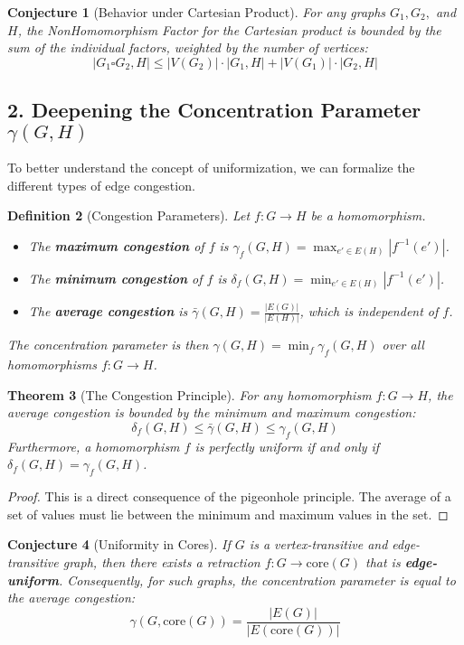 \documentclass[11pt]{article}
\newtheorem{theorem}{Theorem}[section]
\newtheorem{conjecture}[theorem]{Conjecture}
\newtheorem{definition}[theorem]{Definition}
\begin{document}
\begin{conjecture}[Behavior under Cartesian Product]
For any graphs $G_1, G_2,$ and $H$, the NonHomomorphism Factor for the Cartesian product is bounded by the sum of the individual factors, weighted by the number of vertices:
$$|G_1 \square G_2, H| \le |V(G_2)| \cdot |G_1, H| + |V(G_1)| \cdot |G_2, H|$$
\end{conjecture}

\subsection*{2. Deepening the Concentration Parameter $\gamma(G,H)$}
To better understand the concept of uniformization, we can formalize the different types of edge congestion.

\begin{definition}[Congestion Parameters]
Let $f: G \to H$ be a homomorphism.
\begin{itemize}
    \item The \textbf{maximum congestion} of $f$ is $\gamma_f(G,H) = \max_{e' \in E(H)} |f^{-1}(e')|$.
    \item The \textbf{minimum congestion} of $f$ is $\delta_f(G,H) = \min_{e' \in E(H)} |f^{-1}(e')|$.
    \item The \textbf{average congestion} is $\bar{\gamma}(G,H) = \frac{|E(G)|}{|E(H)|}$, which is independent of $f$.
\end{itemize}
The concentration parameter is then $\gamma(G,H) = \min_f \gamma_f(G,H)$ over all homomorphisms $f:G \to H$.
\end{definition}

\begin{theorem}[The Congestion Principle]
For any homomorphism $f: G \to H$, the average congestion is bounded by the minimum and maximum congestion:
$$\delta_f(G,H) \le \bar{\gamma}(G,H) \le \gamma_f(G,H)$$
Furthermore, a homomorphism $f$ is perfectly uniform if and only if $\delta_f(G,H) = \gamma_f(G,H)$.
\end{theorem}
\begin{proof}
This is a direct consequence of the pigeonhole principle. The average of a set of values must lie between the minimum and maximum values in the set.
\end{proof}

\begin{conjecture}[Uniformity in Cores]
If $G$ is a vertex-transitive and edge-transitive graph, then there exists a retraction $f: G \to \mathrm{core}(G)$ that is \textbf{edge-uniform}. Consequently, for such graphs, the concentration parameter is equal to the average congestion:
$$\gamma(G, \mathrm{core}(G)) = \frac{|E(G)|}{|E(\mathrm{core}(G))|}$$
\end{conjecture}
\end{document}
